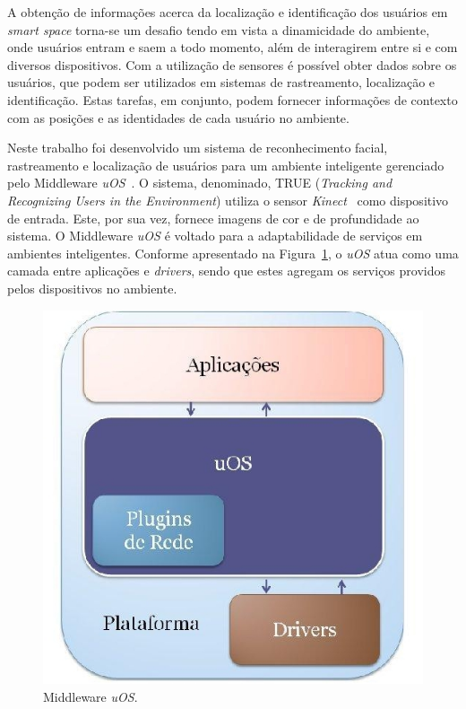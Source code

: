 
A obtenção de informações acerca da localização e identificação dos usuários em \textit{smart space} torna-se um desafio tendo em vista a dinamicidade do ambiente, onde usuários entram e saem a todo momento, além de interagirem entre si e
com diversos dispositivos. Com a utilização de sensores é
possível obter dados sobre os usuários, que podem ser utilizados em
sistemas de rastreamento, localização e identificação. Estas tarefas, em
conjunto, podem fornecer informações de contexto com as posições e as
identidades de cada usuário no ambiente.
	
Neste trabalho foi desenvolvido um sistema de reconhecimento facial, rastreamento e
localização de usuários para um ambiente inteligente gerenciado pelo Middleware \textit{uOS}~\cite{fabriciobuzzeto}. O sistema, denominado, TRUE (\textit{Tracking and Recognizing Users in the Environment}) utiliza o
sensor \textit{Kinect}~\cite{kinect_microsoft} como dispositivo de entrada. Este, por
sua vez, fornece imagens de cor e de profundidade ao sistema. O Middleware \textit{uOS} é voltado para a adaptabilidade de serviços em ambientes inteligentes. Conforme apresentado na Figura~\ref{fig:uos}, o \textit{uOS} atua como uma camada entre aplicações e \textit{drivers}, sendo que estes agregam os serviços providos pelos dispositivos no ambiente.

\begin{figure}[htb]
		\begin{center}
			\includegraphics[scale=0.3]{figuras/1.Introducao/dsoa.jpg}
		\end{center}
		\caption{Middleware \textit{uOS}.}
		\label{fig:uos}
	\end{figure}

